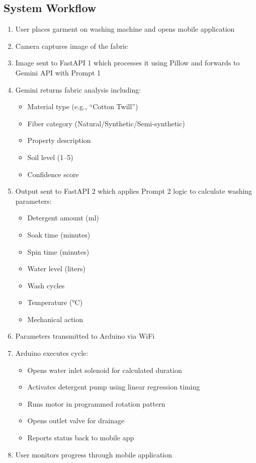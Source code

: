 \subsection{System Workflow}
\begin{enumerate}
    \item User places garment on washing machine and opens mobile application
    \item Camera captures image of the fabric
    \item Image sent to FastAPI 1 which processes it using Pillow and forwards to Gemini API with Prompt 1
    \item Gemini returns fabric analysis including:
        \begin{itemize}
            \item Material type (e.g., “Cotton Twill”)
            \item Fiber category (Natural/Synthetic/Semi-synthetic)
            \item Property description
            \item Soil level (1–5)
            \item Confidence score
        \end{itemize}
    \item Output sent to FastAPI 2 which applies Prompt 2 logic to calculate washing parameters:
        \begin{itemize}
            \item Detergent amount (ml)
            \item Soak time (minutes)
            \item Spin time (minutes)
            \item Water level (liters)
            \item Wash cycles
            \item Temperature (°C)
            \item Mechanical action
        \end{itemize}
    \item Parameters transmitted to Arduino via WiFi
    \item Arduino executes cycle:
        \begin{itemize}
            \item Opens water inlet solenoid for calculated duration
            \item Activates detergent pump using linear regression timing
            \item Runs motor in programmed rotation pattern
            \item Opens outlet valve for drainage
            \item Reports status back to mobile app
        \end{itemize}
    \item User monitors progress through mobile application
\end{enumerate}

